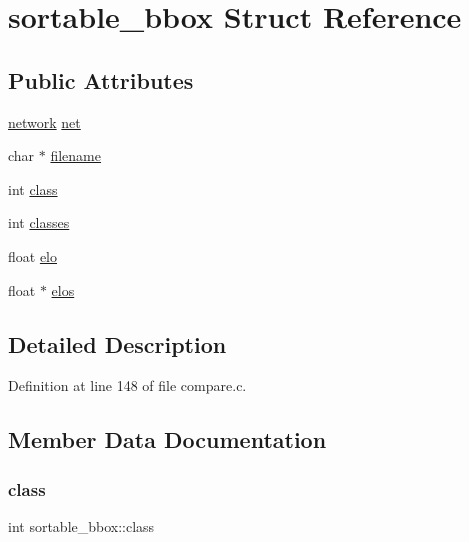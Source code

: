 \hypertarget{structsortable__bbox}{}\section{sortable\+\_\+bbox Struct Reference}
\label{structsortable__bbox}
\subsection*{Public Attributes}
\begin{DoxyCompactItemize}
\item 
\mbox{\hyperlink{structnetwork}{network}} \mbox{\hyperlink{structsortable__bbox_a7f9f2d90e273f7454bbd5e841e23e9e1}{net}}
\item 
char $\ast$ \mbox{\hyperlink{structsortable__bbox_a2a693ab1fef8df90e937a1ad1c8c0442}{filename}}
\item 
int \mbox{\hyperlink{structsortable__bbox_aefe2d2ab36d7ad2e8a104f99580cc9af}{class}}
\item 
int \mbox{\hyperlink{structsortable__bbox_ae063121410175a24bbb9ae8fe901c750}{classes}}
\item 
float \mbox{\hyperlink{structsortable__bbox_a1e117d8029d714fce1491365316432f5}{elo}}
\item 
float $\ast$ \mbox{\hyperlink{structsortable__bbox_ab168cd8c3a7c1570cf7da7f7e30ab19c}{elos}}
\end{DoxyCompactItemize}


\subsection{Detailed Description}


Definition at line 148 of file compare.\+c.



\subsection{Member Data Documentation}
\mbox{\label{structsortable__bbox_aefe2d2ab36d7ad2e8a104f99580cc9af}} 
\subsubsection{\texorpdfstring{class}{class}}
{\footnotesize\ttfamily int sortable\+\_\+bbox\+::class}



